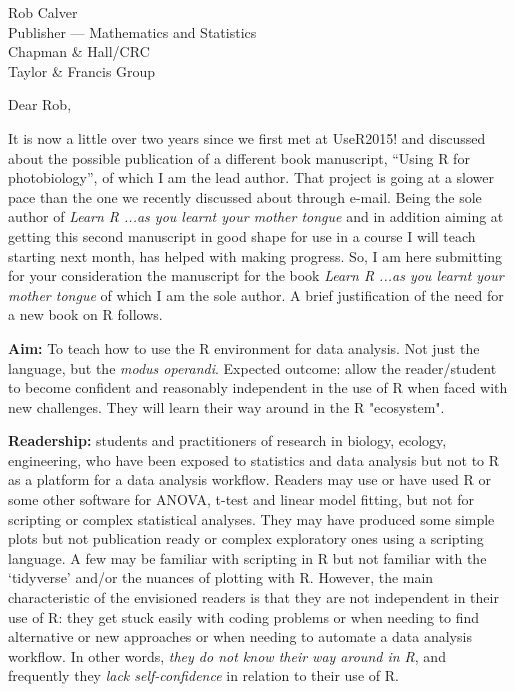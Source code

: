 \documentclass[a4paper]{scrlttr2}
\begin{document}
\begin{letter}{Rob Calver\\Publisher --- Mathematics and Statistics\\ Chapman \& Hall/CRC\\ Taylor \& Francis Group}

\opening{Dear Rob,}

It is now a little over two years since we first met at UseR2015! and discussed about the possible publication of a different book manuscript, ``Using R for photobiology'', of which I am the lead author. That project is going at a slower pace than the one we recently discussed about through e-mail. Being the sole author of \emph{Learn R ...as you learnt your mother tongue} and in addition aiming at getting this second manuscript in good shape for use in a course I will teach starting next month, has helped with making progress. So, I am here submitting for your consideration the manuscript for the book \emph{Learn R ...as you learnt your mother tongue} of which I am the sole author. A brief justification of the need for a new book on R follows.

\textbf{Aim:} To teach how to use the R environment for data analysis. Not just the language, but the \emph{modus operandi}. Expected outcome: allow the reader/student to become confident and reasonably independent in the use of R when faced with new challenges. They will learn their way around in the R "ecosystem".

\textbf{Readership:} students and practitioners of research in biology, ecology, engineering, who have been exposed to statistics and data analysis but not to R as a platform for a data analysis workflow. Readers may use or have used R or some other software for ANOVA, t-test and linear model fitting, but not for scripting or complex statistical analyses. They may have produced some simple plots but not publication ready or complex exploratory ones using a scripting language. A few may be familiar with scripting in R but not familiar with the `tidyverse' and/or the nuances of plotting with R. However, the main characteristic of the envisioned readers is that they are not independent in their use of R: they get stuck easily with coding problems or when needing to find alternative or new approaches or when needing to automate a data analysis workflow. In other words, \emph{they do not know their way around in R}, and frequently they \emph{lack self-confidence} in relation to their use of R.


\end{letter}
\end{document}
